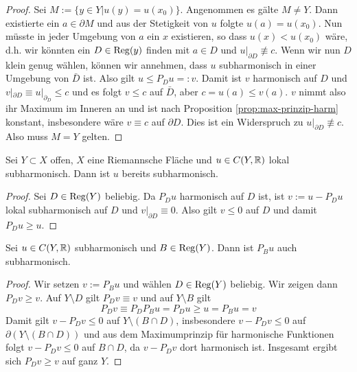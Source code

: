 \begin{proof}
  Sei $M:= \{y \in Y | u(y) = u(x_0) \}$. Angenommen es gälte $M \neq
  Y$. Dann existierte ein $a \in \partial M$ und aus der Stetigkeit
  von $u$ folgte $u(a) = u(x_0)$. Nun müsste in jeder Umgebung von $a$
  ein $x$ existieren, so dass $u(x) < u(x_0)$ wäre, d.h. wir könnten ein
  $D \in \operatorname{Reg}(y)$ finden mit $a \in D$ und $u|_{\partial D} \not
  \equiv c$. Wenn wir nun $D$ klein genug wählen, können wir annehmen, dass $u$
  subharmonisch in einer Umgebung von $\bar D$ ist. Also gilt $u \leq
  P_D u =: v$. Damit ist $v$ harmonisch auf $D$ und $v|_{\partial D} \equiv
  u|_{\partial_D} \leq c$ und es folgt $v \leq c$ auf $\bar D$, aber
  $c = u(a) \leq v(a)$. $v$ nimmt also ihr Maximum im Inneren an und
  ist nach Proposition \ref{prop:max-prinzip-harm} konstant,
  insbesondere wäre $v \equiv c$ auf $\partial D$. Dies ist ein Widerspruch zu
  $u|_{\partial D} \not \equiv c$. Also muss $M = Y$ gelten.
\end{proof}

\begin{cor}
  Sei $Y\subset X$ offen, $X$ eine Riemannsche Fläche und $u \in C(Y,
  \mathbb{R})$ lokal subharmonisch. Dann ist $u$ bereits subharmonisch.
\end{cor}

\begin{proof}
  Sei $D \in \operatorname{Reg}(Y)$ beliebig. Da $P_D u$ harmonisch auf $D$ ist, ist
  $v:= u- P_Du$ lokal subharmonisch auf $D$ und $v|_{\partial D}
  \equiv 0$. Also gilt $v \leq0$ auf $D$ und damit $P_Du \geq u$.
\end{proof}

\begin{lemma}
  Sei $u \in C(Y, \mathbb{R})$ subharmonisch und $B \in \operatorname{Reg}(Y)$. Dann ist
  $P_B u$ auch subharmonisch.
\end{lemma}

\begin{proof}
  Wir setzen $v:= P_B u$ und wählen $D \in \operatorname{Reg}(Y)$ beliebig. Wir
  zeigen dann $P_D v \geq v$. Auf $Y \setminus D$ gilt $P_Dv \equiv v$
  und auf $Y\setminus B$ gilt
  \[
  P_Dv \equiv P_DP_Bu = P_Du \geq u = P_Bu = v
  \]
  Damit gilt $v - P_Dv \leq 0$ auf $Y \setminus (B \cap D)$,
  insbesondere $v- P_D v \leq 0$ auf $\partial (Y \setminus (B \cap
  D))$ und aus dem Maximumprinzip für harmonische Funktionen folgt $v
  - P_D v \leq 0$ auf $B \cap D$, da $v - P_D v$ dort harmonisch
  ist. Insgesamt ergibt sich $P_Dv \geq v$ auf ganz $Y$.
\end{proof}

